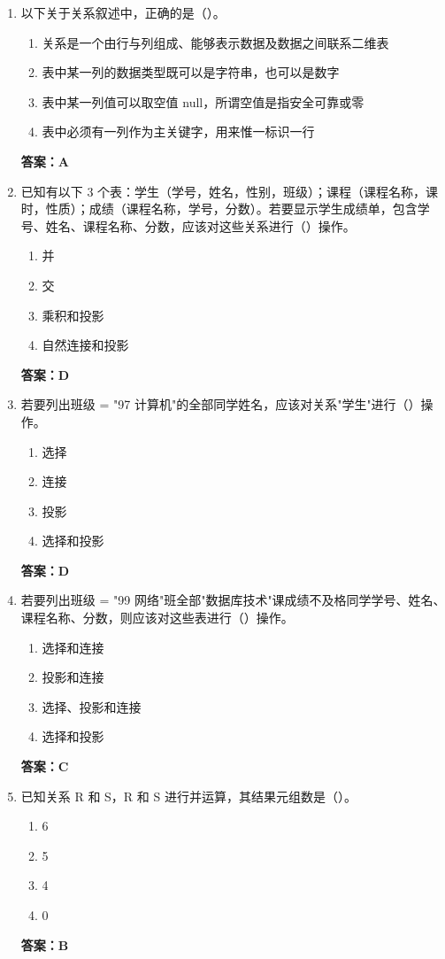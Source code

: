 \documentclass[12pt, a4paper]{article}
\begin{document}
\begin{enumerate}[label=\arabic*.]
	\item 以下关于关系叙述中，正确的是（\quad）。
	      \begin{enumerate}
		      \item 关系是一个由行与列组成、能够表示数据及数据之间联系二维表
		      \item 表中某一列的数据类型既可以是字符串，也可以是数字
		      \item 表中某一列值可以取空值 null，所谓空值是指安全可靠或零
		      \item 表中必须有一列作为主关键字，用来惟一标识一行
	      \end{enumerate}
	      \textbf{答案：A}

	\item 已知有以下 3 个表：学生（学号，姓名，性别，班级）；课程（课程名称，课时，性质）；成绩（课程名称，学号，分数）。若要显示学生成绩单，包含学号、姓名、课程名称、分数，应该对这些关系进行（\quad）操作。
	      \begin{enumerate}
		      \item 并
		      \item 交
		      \item 乘积和投影
		      \item 自然连接和投影
	      \end{enumerate}
	      \textbf{答案：D}

	\item 若要列出班级 = "97 计算机"的全部同学姓名，应该对关系"学生"进行（\quad）操作。
	      \begin{enumerate}
		      \item 选择
		      \item 连接
		      \item 投影
		      \item 选择和投影
	      \end{enumerate}
	      \textbf{答案：D}

	\item 若要列出班级 = "99 网络"班全部"数据库技术"课成绩不及格同学学号、姓名、课程名称、分数，则应该对这些表进行（\quad）操作。
	      \begin{enumerate}
		      \item 选择和连接
		      \item 投影和连接
		      \item 选择、投影和连接
		      \item 选择和投影
	      \end{enumerate}
	      \textbf{答案：C}

	\item 已知关系 R 和 S，R 和 S 进行并运算，其结果元组数是（\quad）。
	      \begin{enumerate}
		      \item 6
		      \item 5
		      \item 4
		      \item 0
	      \end{enumerate}
	      \textbf{答案：B}


\end{enumerate}
\end{document}
